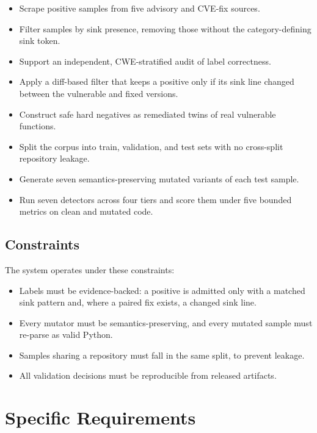 \begin{itemize}
  \item Scrape positive samples from five advisory and CVE-fix sources.
  \item Filter samples by sink presence, removing those without the
    category-defining sink token.
  \item Support an independent, CWE-stratified audit of label correctness.
  \item Apply a diff-based filter that keeps a positive only if its sink line
    changed between the vulnerable and fixed versions.
  \item Construct safe hard negatives as remediated twins of real vulnerable
    functions.
  \item Split the corpus into train, validation, and test sets with no
    cross-split repository leakage.
  \item Generate seven semantics-preserving mutated variants of each test
    sample.
  \item Run seven detectors across four tiers and score them under five bounded
    metrics on clean and mutated code.
\end{itemize}

\subsection{Constraints}

The system operates under these constraints:

\begin{itemize}
  \item Labels must be evidence-backed: a positive is admitted only with a
    matched sink pattern and, where a paired fix exists, a changed sink line.
  \item Every mutator must be semantics-preserving, and every mutated sample
    must re-parse as valid Python.
  \item Samples sharing a repository must fall in the same split, to prevent
    leakage.
  \item All validation decisions must be reproducible from released artifacts.
\end{itemize}


\section{Specific Requirements}

